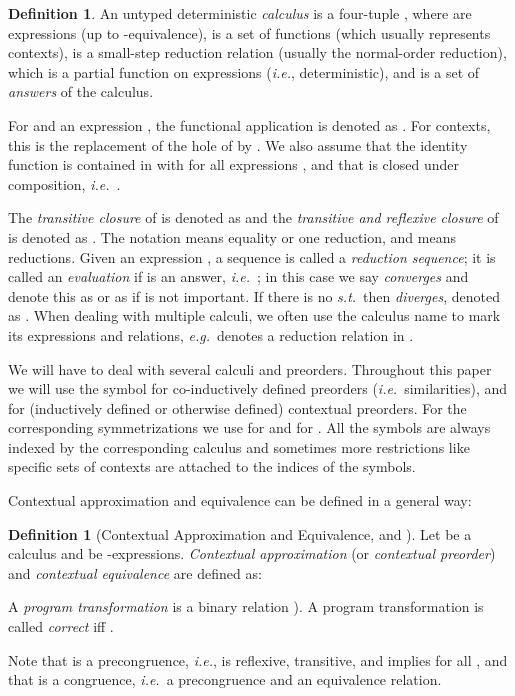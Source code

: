 \documentclass{LMCS}
\theoremstyle{plain}
\theoremstyle{definition}
\newtheorem{definition}[thm]{Definition}
\newcommand{\eg}{{\em e.g.}}
\newcommand{\ie}{{\em i.e.}}
\newcommand{\st}{{\em s.t.}}
\begin{document}
\begin{definition}\label{def:calculus}
An untyped deterministic {\em calculus}  is a four-tuple 
\mbox{}, where  
are expressions (up to -equivalence), 
 is  a set of functions 
(which usually represents contexts),  is a small-step reduction relation
(usually the normal-order reduction), which is a partial function on expressions
(\ie, deterministic), and  is a set of 
{\em answers} of the calculus.

For  and an expression , the functional application is
denoted as  . 
For contexts, this is the replacement of the hole of  by . 
We also assume that the identity function  is contained in 
 with  for all expressions , and that 
 is closed under composition, 
\ie\ . 

The {\em transitive  closure} of  is denoted as  and the
{\em transitive and reflexive closure} of  is denoted as . 
The notation  means equality or one reduction, 
and  means  reductions.
Given an expression , a sequence  is called a
{\em reduction sequence}; it is called an {\em evaluation} if  is an answer,
\ie\ ; in this case we say   {\em converges} and denote 
this as  or as  if  is not important.  
If there is no  \st\  then  {\em diverges},
denoted as . 
When dealing with multiple calculi, we often use the calculus name to mark its
expressions and relations, \eg\  denotes a reduction 
relation in . 
\end{definition}
We will have to deal with several calculi and preorders. Throughout this paper
we will use the symbol  for co-inductively defined preorders 
(\ie\ similarities), and  for (inductively defined or otherwise defined)
contextual preorders. 
For the corresponding symmetrizations we use  for  and
 for . 
All the symbols are always indexed by the corresponding calculus and sometimes
more restrictions like specific sets of contexts are attached to the indices
of the symbols. 

Contextual approximation and equivalence can be defined in a general way:
\begin{definition}[Contextual Approximation and Equivalence,  and ]
Let  be a calculus and 
 be -expressions.
{\em Contextual approximation} (or {\em contextual preorder})   and 
{\em contextual equivalence}  are defined as: 


A {\em program transformation} is a binary relation 
). 
A program transformation  is called {\em correct} iff 
.
\end{definition}
Note that  is a precongruence, \ie,  is reflexive, 
transitive, and  implies  for all 
, and that  is a congruence, \ie\ a 
precongruence and an equivalence relation.
\end{document}
